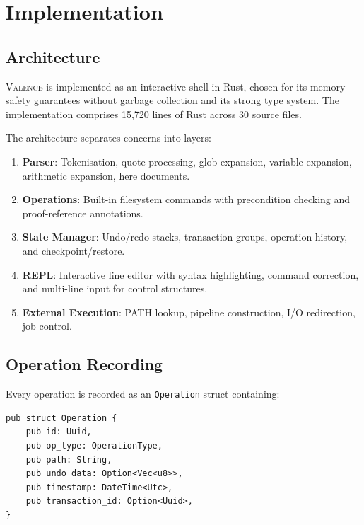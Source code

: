 \documentclass[11pt,a4paper]{article}
\newcommand{\valence}{\textsc{Valence}}
\begin{document}
\section{Implementation}
\label{sec:implementation}

\subsection{Architecture}

\valence{} is implemented as an interactive shell in Rust, chosen for its
memory safety guarantees without garbage collection and its strong type system.
The implementation comprises 15,720 lines of Rust across 30 source files.

The architecture separates concerns into layers:

\begin{enumerate}
  \item \textbf{Parser}: Tokenisation, quote processing, glob expansion,
        variable expansion, arithmetic expansion, here documents.
  \item \textbf{Operations}: Built-in filesystem commands with precondition
        checking and proof-reference annotations.
  \item \textbf{State Manager}: Undo/redo stacks, transaction groups,
        operation history, and checkpoint/restore.
  \item \textbf{REPL}: Interactive line editor with syntax highlighting,
        command correction, and multi-line input for control structures.
  \item \textbf{External Execution}: PATH lookup, pipeline construction,
        I/O redirection, job control.
\end{enumerate}

\subsection{Operation Recording}

Every operation is recorded as an \texttt{Operation} struct containing:

\begin{lstlisting}[style=ruststyle,caption={The Operation type in Rust.}]
pub struct Operation {
    pub id: Uuid,
    pub op_type: OperationType,
    pub path: String,
    pub undo_data: Option<Vec<u8>>,
    pub timestamp: DateTime<Utc>,
    pub transaction_id: Option<Uuid>,
}
\end{lstlisting}
\end{document}
